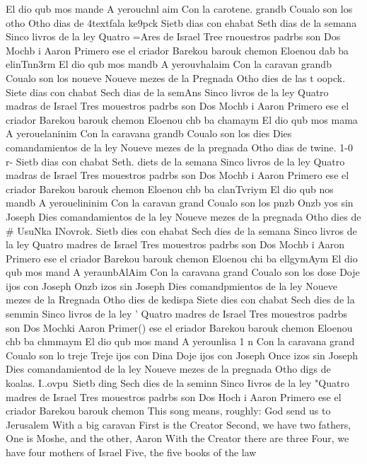 El dio qub mos mande 
A yerouchnl aim 
Con la carotene.
grandb 
Coualo son los otho 
Otho dias de 4textfala ke9pck 
Sietb dias con ehabat 
Seth dias de la semana 
Sinco livros de la ley 
Quatro =Ares de Israel 
Tree rnouestros padrbs son 
Dos Mochb i Aaron 
Primero ese el criador 
Barekou barouk chemon 
Eloenou dab ba elinTnn3rm 
El dio qub mos mandb 
A yerouvhalaim 
Con la caravan grandb 
Coualo son los noueve 
Noueve mezes de la Pregnada 
Otho dies de las t oopck.
Siete dias con chabat 
Sech dias de la semAns 
Sinco livros de la ley 
Quatro madras de Israel 
Tres mouestros padrbs son 
Dos Mochb i Aaron 
Primero ese el criador 
Barekou barouk chemon 
Eloenou chb ba chamaym 
El dio qub mos mama 
A yerouelaninim 
Con la caravana grandb 
Coualo son los dies 
Dies comandamientos de la ley 
Noueve mezes de la pregnada 
Otho dias de twine.
1-0 %
r-
Sietb dias con chabat 
Seth.
diets de la semana 
Sinco livros de la ley 
Quatro madras de Israel 
Tres mouestros padrbs son 
Dos Mochb i Aaron 
Primero ese el criador 
Barekou barouk chemon 
Eloenou chb ba clanTvriym 
El dio qub nos mandb 
A yerouelininim 
Con la caravan grand 
Coualo son los pnzb 
Onzb yos sin Joseph 
Dies comandamientos de la ley 
Noueve mezes de la pregnada 
Otho dies de # UsuNka INovrok.
Sietb dies con ehabat 
Sech dies de la semana 
Sinco livros de la ley 
Quatro madres de Israel 
Tres mouestros padrbs son 
Dos Mochb i Aaron 
Primero ese el criador 
Barekou barouk chemon 
Eloenou chi ba ellgymAym 
El dio qub mos mand 
A yeraunbAlAim 
Con la caravana grand 
Coualo son los dose 
Doje ijos con Joseph 
Onzb izos sin Joseph 
Dies comandpmientos de la ley 
Noueve mezes de la Rregnada 
Otho dies de kedispa 
Siete dies con chabat 
Sech dies de la semmin 
Sinco livros de la ley ' 
Quatro madres de Israel 
Tres mouestros padrbs son 
Dos Mochki Aaron 
Primer() ese el eriador 
Barekou barouk chemon 
Eloenou chb ba chmmaym 
El dio qub mos mand 
A yerounlisa 1 n 
Con la caravana grand 
Coualo son lo treje 
Treje ijos con Dina 
Doje ijos con Joseph 
Once izos sin Joseph 
Dies comandamientod de la ley 
Noueve mezes de la pregnada 
Otho digs de koalas.
I..ovpu\ 
Sietb ding%
Sech dies de la seminn 
Sinco Iivros de la ley 
"Quatro madres de Israel 
Tres mouestros padrbs son 
Dos Hoch i Aaron 
Primero ese el criador 
Barekou barouk chemon 
This song means, roughly: 
God send us to Jerusalem 
With a big caravan 
First is the Creator 
Second, we have two fathers, 
One is Moshe, and the other, Aaron 
With the Creator there are three 
Four, we have four mothers of Israel 
Five, the five books of the law 
